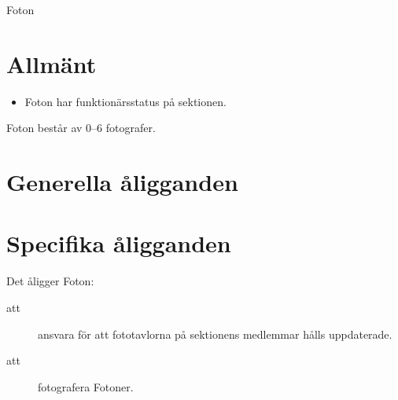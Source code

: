 \documentclass[a4paper]{article}
\begin{document}
\renewcommand{\forening}{Foton} %

\begin{foreningenv}{\forening{}} %
    \section{Allmänt}
    \begin{itemize}
        \item Foton har funktionärsstatus på sektionen.
    \end{itemize}
    Foton består av 0--6 fotografer.
    
    \section{Generella åligganden}
    \aliggsektfor{}
    
    \section{Specifika åligganden}
    Det åligger \forening{}:
    \begin{description}
        \item[att] ansvara för att fototavlorna på sektionens medlemmar hålls uppdaterade.
        \item[att] fotografera Fotoner.
    \end{description}
\end{foreningenv}
\end{document}
